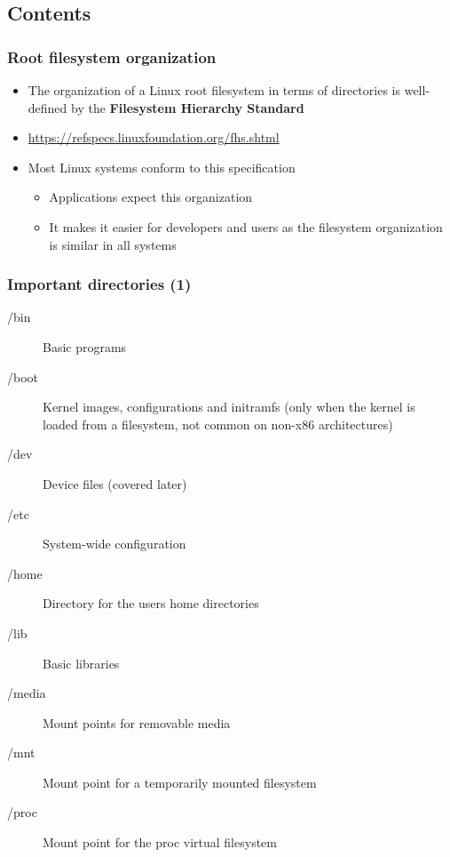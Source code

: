 \subsection{Contents}

\begin{frame}
  \frametitle{Root filesystem organization}
  \begin{itemize}
  \item The organization of a Linux root filesystem in terms of
    directories is well-defined by the {\bf Filesystem Hierarchy
      Standard}
  \item \url{https://refspecs.linuxfoundation.org/fhs.shtml}
  \item Most Linux systems conform to this specification
    \begin{itemize}
    \item Applications expect this organization
    \item It makes it easier for developers and users as the
      filesystem organization is similar in all systems
    \end{itemize}
  \end{itemize}
\end{frame}

\begin{frame}
  \frametitle{Important directories (1)}
  \begin{description}
  \item[/bin] Basic programs
  \item[/boot] Kernel images, configurations and initramfs
    (only when the kernel is loaded from a
    filesystem, not common on non-x86 architectures)
  \item[/dev] Device files (covered later)
  \item[/etc] System-wide configuration
  \item[/home] Directory for the users home directories
  \item[/lib] Basic libraries
  \item[/media] Mount points for removable media
  \item[/mnt] Mount point for a temporarily mounted filesystem
  \item[/proc] Mount point for the proc virtual filesystem
  \end{description}
\end{frame}

